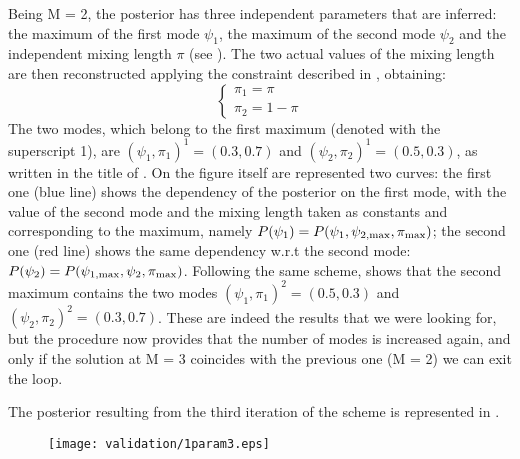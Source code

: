 		Being M = 2, the posterior has three independent parameters that are inferred: the maximum of the first mode $ \psi_1 $, the maximum of the second mode $ \psi_2 $ and the independent mixing length $ \pi $ (see ). The two actual values of the mixing length are then reconstructed applying the constraint described in , obtaining:
		\begin{equation}
			\begin{cases}
				\pi_1 = \pi \\
				\pi_2 = 1 - \pi
			\end{cases}
			\label{eq: 2ML}
		\end{equation}
		The two modes, which belong to the first maximum (denoted with the superscript 1), are $ (\psi_1, \pi_1)^1 = (0.3, 0.7)  $ and $ (\psi_2, \pi_2)^1 = (0.5, 0.3) $, as written in the title of . On the figure itself are represented two curves: the first one (blue line) shows the dependency of the posterior on the first mode, with the value of the second mode and the mixing length taken as constants and corresponding to the maximum, namely $ P(\psi_1) = P(\psi_1, \psi_{2, \textup{max}}, \pi_{\textup{max}}) $; the second one (red line) shows the same dependency w.r.t the second mode: $ P(\psi_2) = P(\psi_{1, \textup{max}}, \psi_2, \pi_{\textup{max}}) $.
		Following the same scheme,  shows that the second maximum contains the two modes  $ (\psi_1, \pi_1)^2 = (0.5, 0.3)  $ and $ (\psi_2, \pi_2)^2 = (0.3, 0.7) $.
		These are indeed the results that we were looking for, but the procedure now provides that the number of modes is increased again, and only if the solution at M = 3 coincides with the previous one (M = 2) we can exit the loop. 
		
		The posterior resulting from the third iteration of the scheme is represented in . 
		\begin{figure}
			\centering
			\texttt{[image: validation/1param3.eps]}
			\caption{}
			\label{val: 1param3}
		\end{figure}
		
		
		
		
		
		
		
		
		
		
		
		
		
		
		
		
		
		
		
